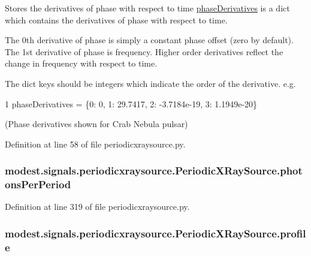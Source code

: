 Stores the derivatives of phase with respect to time  \hyperlink{classmodest_1_1signals_1_1periodicxraysource_1_1PeriodicXRaySource_aba99ee47fdedf6cb2fe5a78fc85d1baa}{phase\+Derivatives} is a dict which contains the derivatives of phase with respect to time. 

The 0th derivative of phase is simply a constant phase offset (zero by default). The 1st derivative of phase is frequency. Higher order derivatives reflect the change in frequency with respect to time.

The dict keys should be integers which indicate the order of the derivative. e.\+g. 
\begin{DoxyCode}
1 phaseDerivatives = \{0: 0, 1: 29.7417, 2: -3.7184e-19, 3: 1.1949e-20\}
\end{DoxyCode}
 (Phase derivatives shown for Crab Nebula pulsar) 

Definition at line 58 of file periodicxraysource.\+py.

\subsubsection[{\texorpdfstring{photons\+Per\+Period}{photonsPerPeriod}}]{\setlength{\rightskip}{0pt plus 5cm}modest.\+signals.\+periodicxraysource.\+Periodic\+X\+Ray\+Source.\+photons\+Per\+Period}\hypertarget{classmodest_1_1signals_1_1periodicxraysource_1_1PeriodicXRaySource_ad8a98679b8f8b313457be3519bbc6fe2}{}\label{classmodest_1_1signals_1_1periodicxraysource_1_1PeriodicXRaySource_ad8a98679b8f8b313457be3519bbc6fe2}


Definition at line 319 of file periodicxraysource.\+py.

\subsubsection[{\texorpdfstring{profile}{profile}}]{\setlength{\rightskip}{0pt plus 5cm}modest.\+signals.\+periodicxraysource.\+Periodic\+X\+Ray\+Source.\+profile}\hypertarget{classmodest_1_1signals_1_1periodicxraysource_1_1PeriodicXRaySource_a584d852c7e7be3d7a3ceb886575e9039}{}\label{classmodest_1_1signals_1_1periodicxraysource_1_1PeriodicXRaySource_a584d852c7e7be3d7a3ceb886575e9039}



